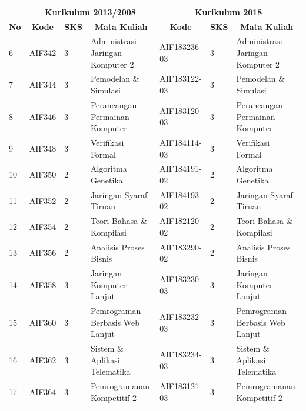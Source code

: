 \begin{table}[H]
\centering
\label{tab:aturankonversipilihan_2}
\begin{tabular}{|p{0.35cm}|p{2cm}|p{0.55cm}|p{3.45cm}|p{2.65cm}|p{0.55cm}|p{3.45cm}|}
\hline
\multicolumn{1}{|c|}{} & \multicolumn{3}{c|}{\textbf{Kurikulum 2013/2008}} & \multicolumn{3}{c|}{\textbf{Kurikulum 2018}} \\ \cline{2-7} 
\multicolumn{1}{|c|}{\multirow{-2}{*}{\textbf{No}}} & \multicolumn{1}{c|}{\textbf{Kode}} & \multicolumn{1}{c|}{\textbf{SKS}} & \multicolumn{1}{c|}{\textbf{Mata Kuliah}} & \multicolumn{1}{c|}{\textbf{Kode}} & \multicolumn{1}{c|}{\textbf{SKS}} & \multicolumn{1}{c|}{\textbf{Mata Kuliah}} \\ \hline
6  & AIF342  &  3 & Administrasi Jaringan Komputer 2 & AIF183236-03 & 3 & Administrasi Jaringan Komputer 2 \\ \hline
7  & AIF344  &  3 & Pemodelan \& Simulasi            & AIF183122-03 & 3 & Pemodelan \& Simulasi            \\ \hline
8  & AIF346  &  3 & Perancangan Permainan Komputer   & AIF183120-03 & 3 & Perancangan Permainan Komputer   \\ \hline
9  & AIF348  & 3  & Verifikasi Formal                & AIF184114-03 & 3 & Verifikasi Formal                \\ \hline
10 & AIF350  &  2 & Algoritma Genetika               & AIF184191-02 & 2 & Algoritma Genetika               \\ \hline
11 & AIF352  &  2 & Jaringan Syaraf Tiruan           & AIF184193-02 & 2 & Jaringan Syaraf Tiruan           \\ \hline
12 & AIF354  &  2 & Teori Bahasa \& Kompilasi        & AIF182120-02 & 2 & Teori Bahasa \& Kompilasi        \\ \hline
13 & AIF356  &  2 & Analisis Proses Bisnis           & AIF183290-02 & 2 & Analisis Proses Bisnis           \\ \hline
14 & AIF358  &  3 & Jaringan Komputer Lanjut         & AIF183230-03 & 3 & Jaringan Komputer Lanjut         \\ \hline
15 & AIF360  & 3  & Pemrograman Berbasis Web Lanjut  & AIF183232-03 & 3 & Pemrograman Berbasis Web Lanjut  \\ \hline
16 & AIF362  &  3 & Sistem \& Aplikasi Telematika    & AIF183234-03 & 3 & Sistem \& Aplikasi Telematika    \\ \hline
17 & AIF364  & 3  & Pemrogramanan Kompetitif 2       & AIF183121-03 & 3 & Pemrogramanan Kompetitif 2       \\ \hline

\end{tabular}
\end{table}

